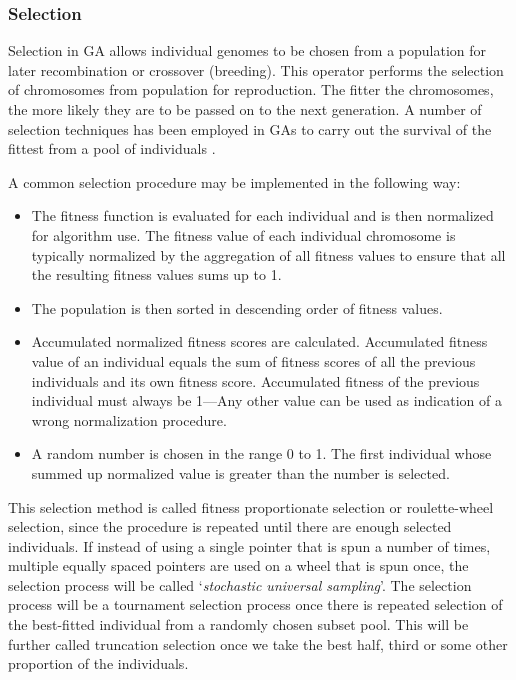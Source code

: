 \documentclass[journal]{IEEEtran}
\begin{document}
\vspace{2mm}
\subsubsection{Selection}

Selection in GA allows individual genomes to be chosen from a population for later recombination or crossover (breeding). This operator performs the selection of chromosomes from population for reproduction. The fitter the chromosomes, the more likely they are to be passed on to the next generation. 
A number of selection techniques has been employed in GAs to carry out the survival of the fittest from a pool of individuals \cite{fette2009cognitive}.

A common selection procedure may be implemented in the following way:

\begin{itemize}

\item The fitness function is evaluated for each individual and is then normalized for algorithm use. The fitness value of each individual chromosome is typically normalized by the aggregation of all fitness values to ensure that  all the resulting fitness values sums up to 1.

\item The population is then sorted in descending order of fitness values.

\item Accumulated normalized fitness scores are calculated. Accumulated fitness value of an individual equals the sum of fitness scores of all the previous individuals and its own fitness score. Accumulated fitness of the previous individual must always be 1---Any other value can be used as indication of a wrong normalization procedure.

\item A random number  is chosen in the range 0 to 1. The first individual whose summed up normalized value is greater than the number  is selected.

\end{itemize}

This selection method is called fitness proportionate selection or roulette-wheel selection, since the procedure is repeated until there are enough selected individuals. If instead of using a single pointer that is spun a number of times, multiple equally spaced pointers are used on a wheel that is spun once, the selection process will be called `\textit{stochastic universal sampling}'. The selection process will be a tournament selection process once there is repeated selection of the best-fitted individual from a randomly chosen subset pool. This will be further called truncation selection once we take the best half, third or some other proportion of the individuals.
\end{document}
